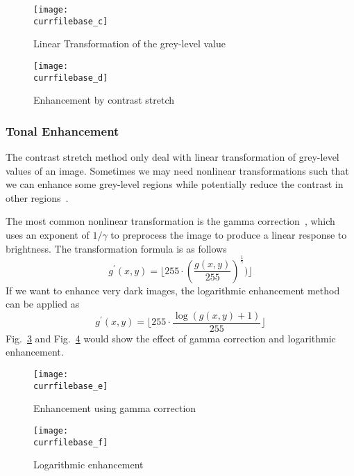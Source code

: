 \documentclass[catalog.tex]{subfiles}
\begin{document}
\begin{figure}
    \centering
    \texttt{[image: \\currfilebase\_c]}
    \caption{Linear Transformation of the grey-level value}
    \label{fig:\currfilebase_c}
\end{figure}

\begin{figure}
    \centering
    \texttt{[image: \\currfilebase\_d]}
    \caption{Enhancement by contrast stretch}
    \label{fig:\currfilebase_d}
\end{figure}

\subsubsection{Tonal Enhancement}
The contrast stretch method only deal with linear transformation of grey-level values of an image. Sometimes we may need nonlinear transformations such that we can enhance some grey-level regions while potentially reduce the contrast in other regions~\cite{fiete_2010}.

The most common nonlinear transformation is the gamma correction~\cite{poynton_2003}, which uses an exponent of $1/\gamma$ to preprocess the image to produce a linear response to brightness. The transformation formula is as follows
$$g^\prime(x, y) = \lfloor 255\cdot(\frac{g(x, y)}{255})^{\frac{1}{\gamma}}) \rfloor$$
If we want to enhance very dark images, the logarithmic enhancement method can be applied as
$$g^\prime(x, y) = \lfloor 255\cdot\frac{\log(g(x, y) + 1)}{255} \rfloor$$
Fig.~\ref{fig:\currfilebase_e} and Fig.~\ref{fig:\currfilebase_f} would show the effect of gamma correction and logarithmic enhancement.

\begin{figure}
    \centering
    \texttt{[image: \\currfilebase\_e]}
    \caption{Enhancement using gamma correction}
    \label{fig:\currfilebase_e}
\end{figure}

\begin{figure}
    \centering
    \texttt{[image: \\currfilebase\_f]}
    \caption{Logarithmic enhancement}
    \label{fig:\currfilebase_f}
\end{figure}

\end{document}
